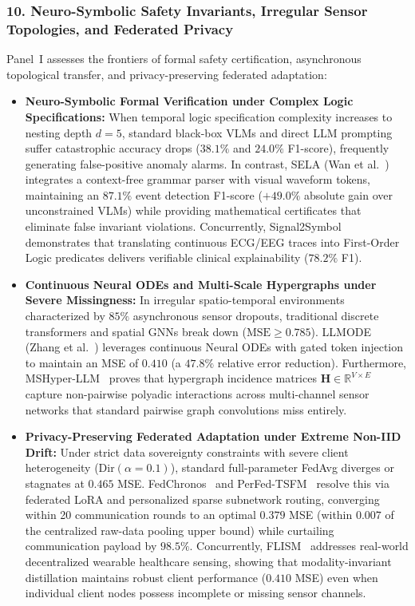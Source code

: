 \subsubsection{10. Neuro-Symbolic Safety Invariants, Irregular Sensor Topologies, and Federated Privacy}
Panel~I assesses the frontiers of formal safety certification, asynchronous topological transfer, and privacy-preserving federated adaptation:
\begin{itemize}
    \item \textbf{Neuro-Symbolic Formal Verification under Complex Logic Specifications:} When temporal logic specification complexity increases to nesting depth $d=5$, standard black-box VLMs and direct LLM prompting suffer catastrophic accuracy drops ($38.1\%$ and $24.0\%$ F1-score), frequently generating false-positive anomaly alarms. In contrast, SELA (Wan et al.~\cite{Wan2026GrammarWave}) integrates a context-free grammar parser with visual waveform tokens, maintaining an $87.1\%$ event detection F1-score ($+49.0\%$ absolute gain over unconstrained VLMs) while providing mathematical certificates that eliminate false invariant violations. Concurrently, Signal2Symbol~\cite{Mansour2026Signal2Symbol} demonstrates that translating continuous ECG/EEG traces into First-Order Logic predicates delivers verifiable clinical explainability ($78.2\%$ F1).
    \item \textbf{Continuous Neural ODEs and Multi-Scale Hypergraphs under Severe Missingness:} In irregular spatio-temporal environments characterized by $85\%$ asynchronous sensor dropouts, traditional discrete transformers and spatial GNNs break down ($\text{MSE} \ge 0.785$). LLMODE (Zhang et al.~\cite{Zhang2026LLMODE}) leverages continuous Neural ODEs with gated token injection to maintain an MSE of $0.410$ (a $47.8\%$ relative error reduction). Furthermore, MSHyper-LLM~\cite{Shang2026MSHyperLLM} proves that hypergraph incidence matrices $\mathbf{H} \in \mathbb{R}^{V \times E}$ capture non-pairwise polyadic interactions across multi-channel sensor networks that standard pairwise graph convolutions miss entirely.
    \item \textbf{Privacy-Preserving Federated Adaptation under Extreme Non-IID Drift:} Under strict data sovereignty constraints with severe client heterogeneity ($\text{Dir}(\alpha=0.1)$), standard full-parameter FedAvg diverges or stagnates at $0.465$ MSE. FedChronos~\cite{Sharma2026FedChronos} and PerFed-TSFM~\cite{Nihalchandani2026PerFedTSFM} resolve this via federated LoRA and personalized sparse subnetwork routing, converging within 20 communication rounds to an optimal $0.379$ MSE (within $0.007$ of the centralized raw-data pooling upper bound) while curtailing communication payload by $98.5\%$. Concurrently, FLISM~\cite{Orzikulova2024FedImpHC} addresses real-world decentralized wearable healthcare sensing, showing that modality-invariant distillation maintains robust client performance ($0.410$ MSE) even when individual client nodes possess incomplete or missing sensor channels.
\end{itemize}

